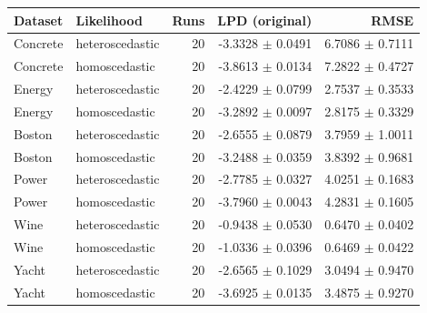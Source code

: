 \begin{tabular}{llrrr}
\toprule
Dataset & Likelihood & Runs & LPD (original) & RMSE \\
\midrule
Concrete & heteroscedastic & 20 & -3.3328 $\pm$ 0.0491 & 6.7086 $\pm$ 0.7111 \\
Concrete & homoscedastic & 20 & -3.8613 $\pm$ 0.0134 & 7.2822 $\pm$ 0.4727 \\
Energy & heteroscedastic & 20 & -2.4229 $\pm$ 0.0799 & 2.7537 $\pm$ 0.3533 \\
Energy & homoscedastic & 20 & -3.2892 $\pm$ 0.0097 & 2.8175 $\pm$ 0.3329 \\
Boston & heteroscedastic & 20 & -2.6555 $\pm$ 0.0879 & 3.7959 $\pm$ 1.0011 \\
Boston & homoscedastic & 20 & -3.2488 $\pm$ 0.0359 & 3.8392 $\pm$ 0.9681 \\
Power & heteroscedastic & 20 & -2.7785 $\pm$ 0.0327 & 4.0251 $\pm$ 0.1683 \\
Power & homoscedastic & 20 & -3.7960 $\pm$ 0.0043 & 4.2831 $\pm$ 0.1605 \\
Wine & heteroscedastic & 20 & -0.9438 $\pm$ 0.0530 & 0.6470 $\pm$ 0.0402 \\
Wine & homoscedastic & 20 & -1.0336 $\pm$ 0.0396 & 0.6469 $\pm$ 0.0422 \\
Yacht & heteroscedastic & 20 & -2.6565 $\pm$ 0.1029 & 3.0494 $\pm$ 0.9470 \\
Yacht & homoscedastic & 20 & -3.6925 $\pm$ 0.0135 & 3.4875 $\pm$ 0.9270 \\
\bottomrule
\end{tabular}
